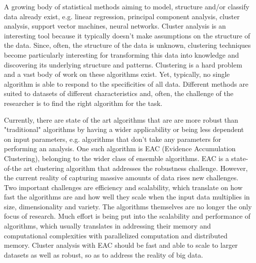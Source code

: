 A growing body of statistical methods aiming to model, structure and/or classify data already exist, e.g. linear regression, principal component analysis, cluster analysis, support vector machines, neural networks.
Cluster analysis is an interesting tool because it typically doesn't make assumptions on the structure of the data.
Since, often, the structure of the data is unknown, clustering techniques become particularly interesting for transforming this data into knowledge and discovering its underlying structure and patterns.
Clustering is a hard problem and a vast body of work on these algorithms exist.
Yet, typically, no single algorithm is able to respond to the specificities of all data.
Different methods are suited to datasets of different characteristics and, often, the challenge of the researcher is to find the right algorithm for the task. %

Currently, there are state of the art algorithms that are are more robust than "traditional" algorithms by having a wider applicability or being less dependent on input parameters, e.g. algorithms that don't take any parameters for performing an analysis.
One such algorithm is EAC (Evidence Accumulation Clustering), belonging to the wider class of ensemble algorithms.
EAC is a state-of-the art clustering algorithm that addresses the robustness challenge.
However, the current reality of capturing massive amounts of data rises new challenges.
Two important challenges are efficiency and scalability, which translate on how fast the algorithms are and how well they scale when the input data multiplies in size, dimensionality and variety.
The algorithms themselves are no longer the only focus of research.
Much effort is being put into the scalability and performance of algorithms, which usually translates in addressing their memory and computational complexities with parallelized computation and distributed memory.
Cluster analysis with EAC should be fast and able to scale to larger datasets as well as robust, so as to address the reality of big data.


